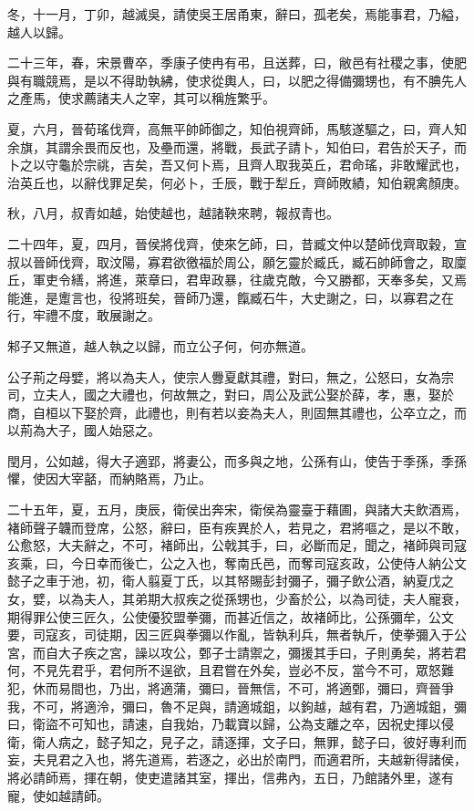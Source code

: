 \begin{pinyinscope}
冬，十一月，丁卯，越滅吳，請使吳王居甬東，辭曰，孤老矣，焉能事君，乃縊，越人以歸。

二十三年，春，宋景曹卒，季康子使冉有弔，且送葬，曰，敝邑有社稷之事，使肥與有職競焉，是以不得助執紼，使求從輿人，曰，以肥之得備彌甥也，有不腆先人之產馬，使求薦諸夫人之宰，其可以稱旌繁乎。

夏，六月，晉荀瑤伐齊，高無平帥師御之，知伯視齊師，馬駭遂驅之，曰，齊人知余旗，其謂余畏而反也，及壘而還，將戰，長武子請卜，知伯曰，君告於天子，而卜之以守龜於宗祧，吉矣，吾又何卜焉，且齊人取我英丘，君命瑤，非敢耀武也，治英丘也，以辭伐罪足矣，何必卜，壬辰，戰于犁丘，齊師敗績，知伯親禽顏庚。

秋，八月，叔青如越，始使越也，越諸鞅來聘，報叔青也。

二十四年，夏，四月，晉侯將伐齊，使來乞師，曰，昔臧文仲以楚師伐齊取穀，宣叔以晉師伐齊，取汶陽，寡君欲徼福於周公，願乞靈於臧氏，臧石帥師會之，取廩丘，軍吏令繕，將進，萊章曰，君卑政暴，往歲克敵，今又勝都，天奉多矣，又焉能進，是躗言也，役將班矣，晉師乃還，餼臧石牛，大史謝之，曰，以寡君之在行，牢禮不度，敢展謝之。

邾子又無道，越人執之以歸，而立公子何，何亦無道。

公子荊之母嬖，將以為夫人，使宗人釁夏獻其禮，對曰，無之，公怒曰，女為宗司，立夫人，國之大禮也，何故無之，對曰，周公及武公娶於薛，孝，惠，娶於商，自桓以下娶於齊，此禮也，則有若以妾為夫人，則固無其禮也，公卒立之，而以荊為大子，國人始惡之。

閏月，公如越，得大子適郢，將妻公，而多與之地，公孫有山，使告于季孫，季孫懼，使因大宰嚭，而納賂焉，乃止。

二十五年，夏，五月，庚辰，衛侯出奔宋，衛侯為靈臺于藉圃，與諸大夫飲酒焉，褚師聲子韤而登席，公怒，辭曰，臣有疾異於人，若見之，君將嘔之，是以不敢，公愈怒，大夫辭之，不可，褚師出，公戟其手，曰，必斷而足，聞之，褚師與司寇亥乘，曰，今日幸而後亡，公之入也，奪南氏邑，而奪司寇亥政，公使侍人納公文懿子之車于池，初，衛人翦夏丁氏，以其帑賜彭封彌子，彌子飲公酒，納夏戊之女，嬖，以為夫人，其弟期大叔疾之從孫甥也，少畜於公，以為司徒，夫人寵衰，期得罪公使三匠久，公使優狡盟拳彌，而甚近信之，故褚師比，公孫彌牟，公文要，司寇亥，司徒期，因三匠與拳彌以作亂，皆執利兵，無者執斤，使拳彌入于公宮，而自大子疾之宮，譟以攻公，鄄子士請禦之，彌援其手曰，子則勇矣，將若君何，不見先君乎，君何所不逞欲，且君嘗在外矣，豈必不反，當今不可，眾怒難犯，休而易間也，乃出，將適蒲，彌曰，晉無信，不可，將適鄄，彌曰，齊晉爭我，不可，將適泠，彌曰，魯不足與，請適城鉏，以鉤越，越有君，乃適城鉏，彌曰，衛盜不可知也，請速，自我始，乃載寶以歸，公為支離之卒，因祝史揮以侵衛，衛人病之，懿子知之，見子之，請逐揮，文子曰，無罪，懿子曰，彼好專利而妄，夫見君之入也，將先道焉，若逐之，必出於南門，而適君所，夫越新得諸侯，將必請師焉，揮在朝，使吏遣諸其室，揮出，信弗內，五日，乃館諸外里，遂有寵，使如越請師。


\end{pinyinscope}
